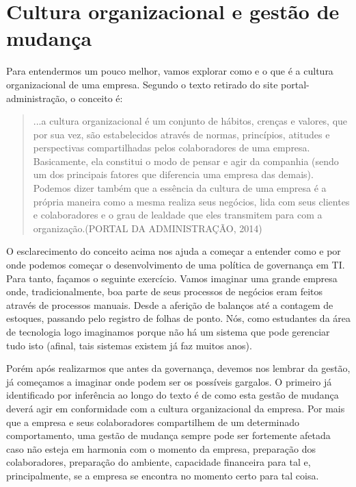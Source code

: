 \section{Cultura organizacional e gestão de mudança}

Para entendermos um pouco melhor, vamos explorar como e o que é a cultura organizacional de uma empresa. Segundo o texto retirado do site portal-administração, o conceito é:

\begin{quotation}
...a cultura organizacional é um conjunto de hábitos, crenças e valores, que por sua vez, são estabelecidos através de normas, princípios, atitudes e perspectivas compartilhadas pelos colaboradores de uma empresa. Basicamente, ela constitui o modo de pensar e agir da companhia (sendo um dos principais fatores que diferencia uma empresa das demais). Podemos dizer também que a essência da cultura de uma empresa é a própria maneira como a mesma realiza seus negócios, lida com seus clientes e colaboradores e o grau de lealdade que eles transmitem para com a organização.(PORTAL DA ADMINISTRAÇÃO, 2014)\cite{PORTALADM}
\end{quotation}

O esclarecimento do conceito acima nos ajuda a começar a entender como e por onde podemos começar o desenvolvimento de uma política de governança em TI. Para tanto, façamos o seguinte exercício. Vamos imaginar uma grande empresa onde, tradicionalmente, boa parte de seus processos de negócios eram feitos através de processos manuais. Desde a aferição de balanços até a contagem de estoques, passando pelo registro de folhas de ponto. Nós, como estudantes da área de tecnologia logo imaginamos porque não há um sistema que pode gerenciar tudo isto (afinal, tais sistemas existem já faz muitos anos). 

Porém após realizarmos que antes da governança, devemos nos lembrar da gestão, já começamos a imaginar onde podem ser os possíveis gargalos. O primeiro já identificado por inferência ao longo do texto é de como esta gestão de mudança deverá agir em conformidade com a cultura organizacional da empresa. Por mais que a empresa e seus colaboradores compartilhem de um determinado comportamento, uma gestão de mudança sempre pode ser fortemente afetada caso não esteja em harmonia com o momento da empresa, preparação dos colaboradores, preparação do ambiente, capacidade financeira para tal e, principalmente, se a empresa se encontra no momento certo para tal coisa. 

